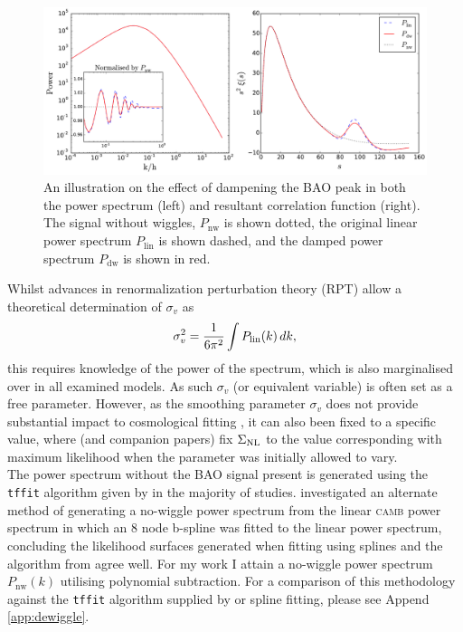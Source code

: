 \documentclass[titlesmallcaps, examinerscopy, copyrightpage]{uqthesis}
\newcommand{\camb}{\textsc{camb}}
\begin{document}
\begin{figure}[h!]
  \begin{center}
    \includegraphics[width=\textwidth]{images/dwExample.pdf}
  \end{center}
  \caption{An illustration on the effect of dampening the BAO peak in both the power spectrum (left) and resultant correlation function (right). The signal without wiggles, $P_{\mathrm{nw}}$ is shown dotted, the original linear power spectrum $P_{\mathrm{lin}}$ is shown dashed, and the damped power spectrum $P_{\mathrm{dw}}$ is shown in red.}
  \label{fig:dwExample}
\end{figure}



Whilst advances in renormalization perturbation theory (RPT)  \citep{CrocceScoccimarro2008} allow a theoretical determination of $\sigma_v$ as
\begin{align} \label{eq:sigmav}
\sigma_v^2 = \frac{1}{6\pi^2} \int P_{\rm{lin}}(k)\, dk,
\end{align}
this requires knowledge of the power of the spectrum, which is also marginalised over in all examined models. As such $\sigma_v$ (or equivalent variable) is often set as a free parameter. However, as the smoothing parameter $\sigma_v$ does not provide substantial impact to cosmological fitting \citep{ReidPercival2010, XuPadmanabhan2012}, it can also been fixed to a specific value, where \citet{XuPadmanabhan2012} (and companion papers) fix $\Sigma_{\rm{NL}}$ to the value corresponding with maximum likelihood when the parameter was initially allowed to vary.\\



The power spectrum without the BAO signal present is generated using the \verb;tffit; algorithm given by \citet{EisensteinHu1998} in the majority of studies. \citet{ReidPercival2010} investigated an alternate method of generating a no-wiggle power spectrum from the linear \camb{} power spectrum in which an 8 node b-spline was fitted to the linear power spectrum, concluding the likelihood surfaces generated when fitting using splines and the algorithm from \citet{EisensteinHu1998} agree well. For my work I attain a no-wiggle power spectrum $P_{\mathrm{nw}}(k)$ utilising polynomial subtraction. For a comparison of this methodology against the \verb;tffit; algorithm supplied by \citet{EisensteinHu1998} or spline fitting, please see Append \ref{app:dewiggle}.
\end{document}
